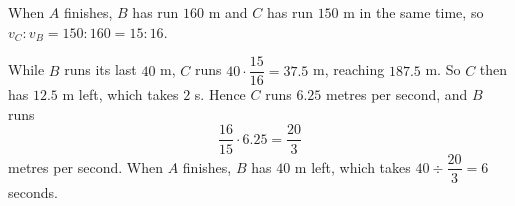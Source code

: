 When $A$ finishes, $B$ has run $160$ m and $C$ has run $150$ m in the same time, so $v_C:v_B=150:160=15:16$.

While $B$ runs its last $40$ m, $C$ runs $40\cdot\dfrac{15}{16}=37.5$ m, reaching $187.5$ m. So $C$ then has $12.5$ m left, which takes $2$ s. Hence $C$ runs $6.25$ metres per second, and $B$ runs
\[\dfrac{16}{15}\cdot6.25=\dfrac{20}{3}\]
metres per second. When $A$ finishes, $B$ has $40$ m left, which takes $40\div\dfrac{20}3=\boxed{6}$ seconds.
